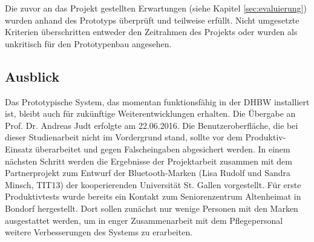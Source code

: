 Die zuvor an das Projekt gestellten Erwartungen (siehe Kapitel \ref{sec:evaluierung}) wurden anhand des Prototyps überprüft und teilweise erfüllt. Nicht umgesetzte Kriterien überschritten entweder den Zeitrahmen des Projekts oder wurden als unkritisch für den Prototypenbau angesehen.
\subsection{Ausblick}
Das Prototypische System, das momentan funktionsfähig in der DHBW installiert ist, bleibt auch für zukünftige Weiterentwicklungen erhalten. Die Übergabe an Prof. Dr. Andreas Judt erfolgte am 22.06.2016. Die Benutzeroberfläche, die bei dieser Studienarbeit nicht im Vordergrund stand, sollte vor dem Produktiv-Einsatz überarbeitet und gegen Falscheingaben abgesichert werden.
In einem nächsten Schritt werden die Ergebnisse der Projektarbeit zusammen mit dem Partnerprojekt zum Entwurf der Bluetooth-Marken (Lisa Rudolf und Sandra Minsch, TIT13) der kooperierenden Universität St. Gallen vorgestellt. Für erste Produktivtests wurde bereits ein Kontakt zum Seniorenzentrum Altenheimat in Bondorf hergestellt. Dort sollen zunächst nur wenige Personen mit den Marken ausgestattet werden, um in enger Zusammenarbeit mit dem Pflegepersonal weitere Verbesserungen des Systems zu erarbeiten.  
